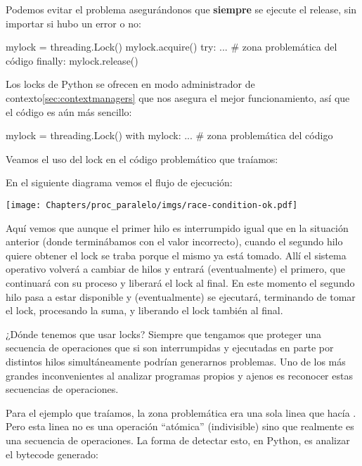 Podemos evitar el problema asegurándonos que \textbf{siempre} se ejecute el release, sin importar si hubo un error o no:

\begin{py}
mylock = threading.Lock()
mylock.acquire()
try:
    ... # zona problemática del código
finally:
    mylock.release()
\end{py}

Los locks de Python se ofrecen en modo administrador de contexto\ref{sec:contextmanagers} que nos asegura el mejor funcionamiento, así que el código es aún más sencillo:

\begin{py}
mylock = threading.Lock()
with mylock:
    ... # zona problemática del código
\end{py}

Veamos el uso del lock en el código problemático que traíamos:



En el siguiente diagrama vemos el flujo de ejecución:

\begin{center}
    \texttt{[image: Chapters/proc\_paralelo/imgs/race-condition-ok.pdf]}
\end{center}

Aquí vemos que aunque el primer hilo es interrumpido igual que en la situación anterior (donde terminábamos con el valor incorrecto), cuando el segundo hilo quiere obtener el lock se traba porque el mismo ya está tomado. Allí el sistema operativo volverá a cambiar de hilos y entrará (eventualmente) el primero, que continuará con su proceso y liberará el lock al final. En este momento el segundo hilo pasa a estar disponible y (eventualmente) se ejecutará, terminando de tomar el lock, procesando la suma, y liberando el lock también al final.

¿Dónde tenemos que usar locks? Siempre que tengamos que proteger una secuencia de operaciones que si son interrumpidas y ejecutadas en parte por distintos hilos simultáneamente podrían generarnos problemas. Uno de los más grandes inconvenientes al analizar programas propios y ajenos es reconocer estas secuencias de operaciones.

Para el ejemplo que traíamos, la zona problemática era una sola linea que hacía . Pero esta linea no es una operación ``atómica'' (indivisible) sino que realmente es una secuencia de operaciones. La forma de detectar esto, en Python, es analizar el bytecode generado:

